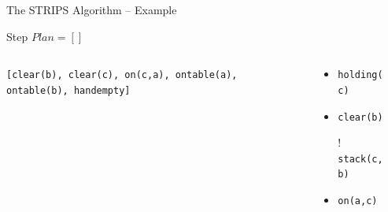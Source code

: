 \documentclass[presentation]{beamer}\mode<presentation>{\usetheme{AMSBolognaFC}}
\begin{document}
\begin{frame}[c]{The STRIPS Algorithm -- Example}
\small

    \begin{exampleblock}{Step \nextStripsExampleStep{} \hfill $Plan = []$}
        \begin{columns}[t]
            \begin{column}{.30\linewidth}\centering
                \texttt{[clear(b), clear(c), on(c,a), ontable(a), ontable(b), handempty]}
            \end{column}
            \begin{column}{.50\linewidth}\centering
                \begin{itemize}
                    \item \texttt{holding(c)}
                    \item \texttt{clear(b)}
                    \item[!] \texttt{stack(c,b)}
                    \item \texttt{on(a,c)}
                \end{itemize}
            \end{column}
            \begin{column}{.10\linewidth}\centering
                
            \end{column}
        \end{columns}
    \end{exampleblock}

\end{frame}
\end{document}
